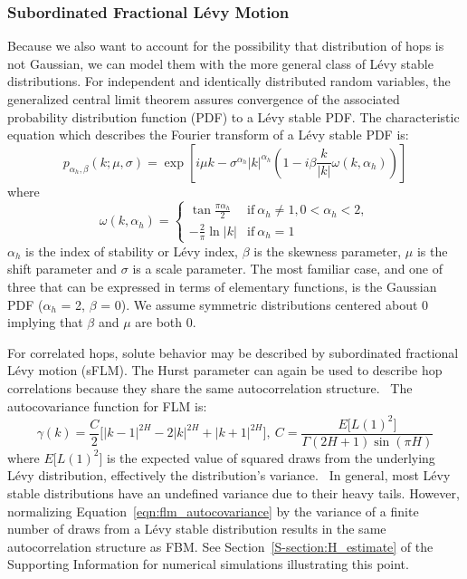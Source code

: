 \documentclass[aps,pre,preprint,groupedaddress]{revtex4-2}
\begin{document}
  \subsubsection{Subordinated Fractional L\'evy Motion}\label{method:sflm}

  Because
  we also want to account for the possibility that distribution of hops is 
  not Gaussian, we can model them with the more general class of L\'evy stable 
  distributions. For independent and identically distributed random variables, 
  the generalized central limit theorem assures convergence of the associated 
  probability distribution function (PDF) to a L\'evy stable PDF. \cite{klages_anomalous_2008}
  The characteristic equation which describes the Fourier transform of a L\'evy stable PDF is:
  \begin{equation}
    p_{\alpha_h, \beta}(k;\mu,\sigma) =\exp\left[i\mu k - \sigma^{\alpha_h}|k|^{\alpha_h}\left(1 - i\beta\frac{k}{|k|}\omega(k, \alpha_h)\right)\right]
  \end{equation}
  where \\
  \[\omega(k, \alpha_h) = \begin{cases}
  	\tan{\frac{\pi \alpha_h}{2}} & \text{if}~\alpha_h \neq 1, 0 < \alpha_h < 2, \\
  	-\frac{2}{\pi}\ln |k| & \text{if}~\alpha_h = 1
  	 \end{cases}
  \]
  $\alpha_h$ is the index of stability or L\'evy index, $\beta$ is the skewness 
  parameter, $\mu$ is the shift parameter and $\sigma$ is a scale parameter. The most
  familiar case, and one of three that can be expressed in terms of elementary functions,
  is the Gaussian PDF ($\alpha_h$ = 2, $\beta$ = 0). We assume symmetric distributions
  centered about 0 implying that $\beta$ and $\mu$ are both 0.
  
  For correlated hops, solute behavior may be described by subordinated 
  fractional L\'evy motion (sFLM). The Hurst parameter can again be used to describe
  hop correlations because they share the same autocorrelation structure.~\cite{tikanmaki_fractional_2010}
  The autocovariance function for FLM is:
  \begin{equation}
    \gamma(k) = \dfrac{C}{2}\bigg[|k-1|^{2H} - 2|k|^{2H} + |k+1|^{2H}\bigg],
    ~C = \frac{E\big[L(1)^2\big]}{\Gamma(2H + 1)\sin(\pi H)}
    \label{eqn:flm_autocovariance}
  \end{equation}
  where $E\big[L(1)^2\big]$ is the expected value of squared draws from the 
  underlying L\'evy distribution, effectively the distribution's 
  variance.~\cite{bishwal_maximum_2011} In general, most L\'evy stable distributions
  have an undefined variance due to their heavy tails. However, normalizing
  Equation~\ref{eqn:flm_autocovariance} by the variance of a finite number of draws
  from a L\'evy stable distribution results in the same autocorrelation structure as FBM.
  See Section~\ref{S-section:H_estimate} of the Supporting Information for numerical
  simulations illustrating this point.  %
  
\end{document}
